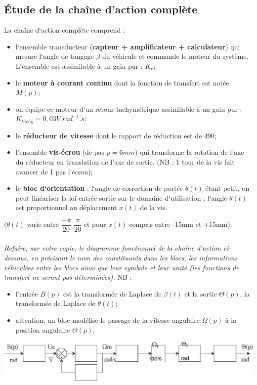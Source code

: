\documentclass[10pt,fleqn]{article} %
\begin{document}
\begin{multicols}{2}
\subsection*{Étude de la chaîne d’action complète}
La chaîne d‘action complète comprend :
\begin{itemize}
 \item l‘ensemble transducteur (\textbf{capteur + amplificateur + calculateur})
qui mesure l‘angle de tangage $\beta$ du véhicule et commande le moteur du
système. L‘ensemble est assimilable à un gain pur : $K_c$;
\item le \textbf{moteur à courant continu} dont la fonction de transfert est
notée $M(p)$;
\item on équipe ce moteur d‘un retour tachymétrique assimilable à un gain pur : 
   $K_{tachy}=0,03 V.rad^{-1}.s$;
\item le \textbf{réducteur de vitesse} dont le rapport de réduction est de 490;
\item l’ensemble \textbf{vis-écrou} (de pas $p = 6mm$) qui transforme la
rotation de l’axe du réducteur en translation de l’axe de sortie. (NB : 1
tour de la vis fait avancer de 1 pas l’écrou);
\item le \textbf{bloc d‘orientation} : l‘angle de correction de portée
$\theta(t)$ étant petit, on peut linéariser la loi entrée-sortie sur le
domaine d‘utilisation ; l‘angle $\theta(t)$ est proportionnel au déplacement
$x(t)$ de la vis.
\end{itemize}

($\theta(t)$ varie entre $\dfrac{-\pi}{20}$ $\dfrac{\pi}{20}$ et pour
$x(t)$ compris entre -15mm et +15mm).

\subparagraph{}
\textit{Refaire, sur votre copie, le diagramme fonctionnel de la chaîne d‘action
ci-dessous, en précisant le nom des constituants dans les blocs, les
informations véhiculées entre les blocs ainsi que leur symbole et leur unité
(les fonctions de transfert ne seront pas déterminées).}
NB : 
\begin{itemize}
 \item l’entrée $B(p)$ est la transformée de Laplace de $\beta(t)$ et la sortie
$\Theta(p)$, la transformée de Laplace de $\theta(t)$;
\item attention, un bloc modélise le passage de la vitesse angulaire $\Omega(p)$
à la position angulaire $\Theta(p)$.
\end{itemize}

\begin{center}
 \includegraphics[width=.9\linewidth]{images/image1_4}
\end{center}


\end{multicols}
\end{document}
